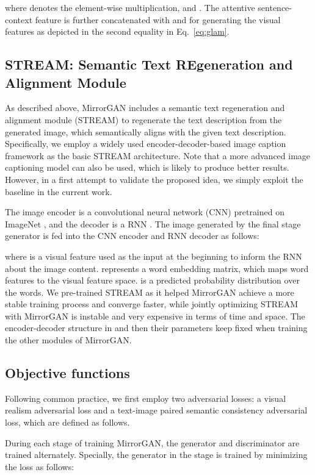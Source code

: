 \documentclass[10pt,twocolumn,letterpaper]{article}
\begin{document}
where  denotes the element-wise multiplication,  and . The attentive sentence-context feature  is further concatenated with  and  for generating the  visual features  as depicted in the second equality in Eq.~\eqref{eq:glam}.

\subsection{STREAM: Semantic Text REgeneration and Alignment Module}
As described above, MirrorGAN includes a semantic text regeneration and alignment module (STREAM) to regenerate the text description from the generated image, which semantically aligns with the given text description. Specifically, we employ a widely used encoder-decoder-based image caption framework \cite{karpathy2015deep,vinyals2015show} as the basic STREAM architecture. Note that a more advanced image captioning model can also be used, which is likely to produce better results. However, in a first attempt to validate the proposed idea, we simply exploit the baseline in the current work. 

The image encoder is a convolutional neural network (CNN) \cite{he2016deep} pretrained on ImageNet \cite{deng2009imagenet}, and the decoder is a RNN \cite{hochreiter1997long}. The image  generated by the final stage generator is fed into the CNN encoder and RNN decoder as follows: 

where  is a visual feature used as the input at the beginning to inform the RNN about the image content.  represents a word embedding matrix, which maps word features to the visual feature space.  is a predicted probability distribution over the words. We pre-trained STREAM as it helped MirrorGAN achieve a more stable training process and converge faster, while jointly optimizing STREAM with MirrorGAN is instable and very expensive in terms of time and space. The encoder-decoder structure in \cite{vinyals2015show} and then their parameters keep fixed when training the other modules of MirrorGAN.



\subsection{Objective functions}
Following common practice, we first employ two adversarial losses: a visual realism adversarial loss and a text-image paired semantic consistency adversarial loss, which are defined as follows.

During each stage of training MirrorGAN, the generator  and discriminator  are trained alternately. Specially, the generator  in the  stage is trained by minimizing the loss as follows:
\end{document}
